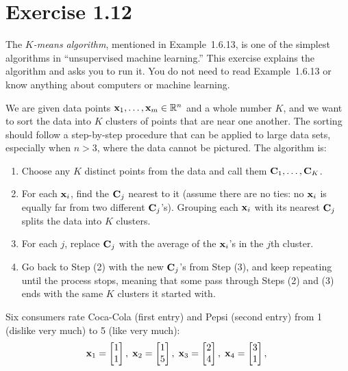 \section*{Exercise 1.12}
\begin{exercise}
The \emph{$K$-means algorithm}, mentioned in Example~1.6.13, is one of the
simplest algorithms in ``unsupervised machine learning.'' This exercise explains
the algorithm and asks you to run it. You do not need to read Example~1.6.13 or
know anything about computers or machine learning.

We are given data points $\mathbf{x}_1, \dots, \mathbf{x}_m \in \mathbb{R}^n$ and a whole
number $K$, and we want to sort the data into $K$ clusters of points that are
near one another. The sorting should follow a step-by-step procedure that can be
applied to large data sets, especially when $n > 3$, where the data cannot be
pictured. The algorithm is:
\begin{enumerate}[label=(\arabic*)]
  \item Choose any $K$ distinct points from the data and call them
        $\mathbf{C}_1, \dots, \mathbf{C}_K$.
  \item For each $\mathbf{x}_i$, find the $\mathbf{C}_j$ nearest to it (assume there
        are no ties: no $\mathbf{x}_i$ is equally far from two different
        $\mathbf{C}_j$'s). Grouping each $\mathbf{x}_i$ with its nearest $\mathbf{C}_j$
        splits the data into $K$ clusters.
  \item For each $j$, replace $\mathbf{C}_j$ with the average of the $\mathbf{x}_i$'s
        in the $j$th cluster.
  \item Go back to Step (2) with the new $\mathbf{C}_j$'s from Step (3), and keep
        repeating until the process stops, meaning that some pass through
        Steps (2) and (3) ends with the same $K$ clusters it started with.
\end{enumerate}
Six consumers rate Coca-Cola (first entry) and Pepsi (second entry) from 1
(dislike very much) to 5 (like very much):
\[
  \mathbf{x}_1 = \begin{bmatrix} 1 \\ 1 \end{bmatrix},\;
  \mathbf{x}_2 = \begin{bmatrix} 1 \\ 5 \end{bmatrix},\;
  \mathbf{x}_3 = \begin{bmatrix} 2 \\ 4 \end{bmatrix},\;
  \mathbf{x}_4 = \begin{bmatrix} 3 \\ 1 \end{bmatrix},\;
\]
\end{exercise}
